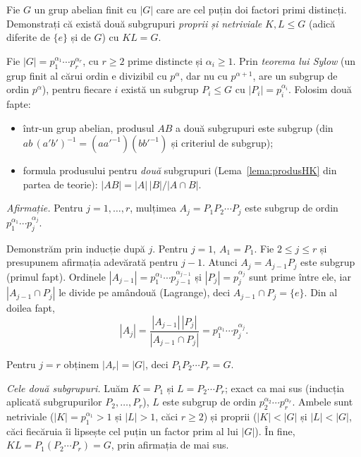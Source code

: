 \begin{problema}
Fie $G$ un grup abelian finit cu $|G|$ care are cel puțin doi factori
primi distincți. Demonstrați că există două subgrupuri
\emph{proprii și netriviale} $K,L\le G$ (adică diferite de $\{e\}$ și de $G$) cu $KL=G$.
\end{problema}

\begin{solutie}
Fie $|G|=p_{1}^{\alpha_{1}}\cdots p_{r}^{\alpha_{r}}$, cu $r\ge2$ prime
distincte și $\alpha_{i}\ge1$. Prin \emph{teorema lui Sylow} (un grup
finit al cărui ordin e divizibil cu $p^{\alpha}$, dar nu cu $p^{\alpha+1}$,
are un subgrup de ordin $p^{\alpha}$), pentru fiecare $i$ există un
subgrup $P_{i}\le G$ cu $|P_{i}|=p_{i}^{\alpha_{i}}$. Folosim două fapte:
\begin{itemize}[nosep,leftmargin=1.4em]
  \item într-un grup abelian, produsul $AB$ a două subgrupuri este
        subgrup (din $ab\,(a'b')^{-1}=(aa'^{-1})(bb'^{-1})$ și criteriul
        de subgrup);
  \item formula produsului pentru \emph{două} subgrupuri
        (Lema~\ref{lema:produsHK} din partea de teorie):
        $|AB|=|A|\,|B|/|A\cap B|$.
\end{itemize}

\smallskip
\textit{Afirmație.} Pentru $j=1,\dots,r$, mulțimea
$A_{j}=P_{1}P_{2}\cdots P_{j}$ este subgrup de ordin
$p_{1}^{\alpha_{1}}\cdots p_{j}^{\alpha_{j}}$.

Demonstrăm prin inducție după $j$. Pentru $j=1$, $A_{1}=P_{1}$. Fie
$2\le j\le r$ și presupunem afirmația adevărată pentru $j-1$. Atunci
$A_{j}=A_{j-1}P_{j}$ este subgrup (primul fapt). Ordinele
$|A_{j-1}|=p_{1}^{\alpha_{1}}\cdots p_{j-1}^{\alpha_{j-1}}$ și
$|P_{j}|=p_{j}^{\alpha_{j}}$ sunt prime între ele, iar $|A_{j-1}\cap P_{j}|$
le divide pe amândouă (Lagrange), deci $A_{j-1}\cap P_{j}=\{e\}$. Din al
doilea fapt,
\[
  |A_{j}|=\frac{|A_{j-1}|\,|P_{j}|}{|A_{j-1}\cap P_{j}|}
  =p_{1}^{\alpha_{1}}\cdots p_{j}^{\alpha_{j}} .
\]

Pentru $j=r$ obținem $|A_{r}|=|G|$, deci $P_{1}P_{2}\cdots P_{r}=G$.

\smallskip
\textit{Cele două subgrupuri.} Luăm $K=P_{1}$ și
$L=P_{2}\cdots P_{r}$; exact ca mai sus (inducția aplicată
subgrupurilor $P_{2},\dots,P_{r}$), $L$ este subgrup de ordin
$p_{2}^{\alpha_{2}}\cdots p_{r}^{\alpha_{r}}$. Ambele sunt netriviale
($|K|=p_{1}^{\alpha_{1}}>1$ și $|L|>1$, căci $r\ge2$) și proprii
($|K|<|G|$ și $|L|<|G|$, căci fiecăruia îi lipsește cel puțin un factor
prim al lui $|G|$). În fine, $KL=P_{1}(P_{2}\cdots P_{r})=G$, prin
afirmația de mai sus.
\end{solutie}

